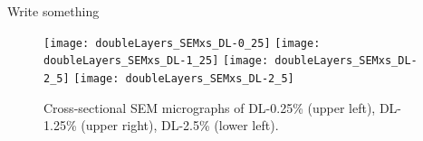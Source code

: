 \documentclass[\main/dresen_thesis.tex]{subfiles}
\begin{document}
  \label{sec:doublelayers:layers:sem}
  Write something
  \begin{figure}[tb]
    \centering
    \texttt{[image: doubleLayers\_SEMxs\_DL-0\_25]} %
    \texttt{[image: doubleLayers\_SEMxs\_DL-1\_25]} %
    \texttt{[image: doubleLayers\_SEMxs\_DL-2\_5]} %
    \texttt{[image: doubleLayers\_SEMxs\_DL-2\_5]} %
    \caption{\label{fig:doublelayers:layers:xs}Cross-sectional SEM micrographs of DL-0.25\% (upper left), DL-1.25\% (upper right), DL-2.5\% (lower left).}
  \end{figure}





\end{document}
